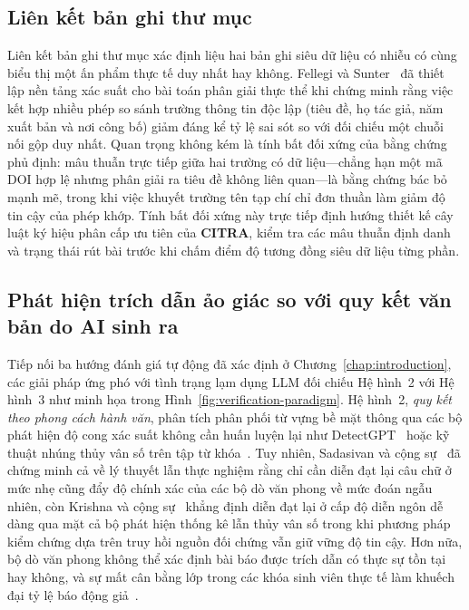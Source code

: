 \subsection{Liên kết bản ghi thư mục}

Liên kết bản ghi thư mục xác định liệu hai bản ghi siêu dữ liệu có nhiễu có cùng biểu thị một ấn phẩm thực tế duy nhất hay không. Fellegi và Sunter~\cite{Fellegi1969} đã thiết lập nền tảng xác suất cho bài toán phân giải thực thể khi chứng minh rằng việc kết hợp nhiều phép so sánh trường thông tin độc lập (tiêu đề, họ tác giả, năm xuất bản và nơi công bố) giảm đáng kể tỷ lệ sai sót so với đối chiếu một chuỗi nối gộp duy nhất. Quan trọng không kém là tính bất đối xứng của bằng chứng phủ định: mâu thuẫn trực tiếp giữa hai trường có dữ liệu---chẳng hạn một mã DOI hợp lệ nhưng phân giải ra tiêu đề không liên quan---là bằng chứng bác bỏ mạnh mẽ, trong khi việc khuyết trường tên tạp chí chỉ đơn thuần làm giảm độ tin cậy của phép khớp. Tính bất đối xứng này trực tiếp định hướng thiết kế cây luật ký hiệu phân cấp ưu tiên của \textbf{CITRA}, kiểm tra các mâu thuẫn định danh và trạng thái rút bài trước khi chấm điểm độ tương đồng siêu dữ liệu từng phần.

\subsection{Phát hiện trích dẫn ảo giác so với quy kết văn bản do AI sinh ra}

Tiếp nối ba hướng đánh giá tự động đã xác định ở Chương~\ref{chap:introduction}, các giải pháp ứng phó với tình trạng lạm dụng LLM đối chiếu Hệ hình~2 với Hệ hình~3 như minh họa trong Hình~\ref{fig:verification-paradigm}. Hệ hình~2, \emph{quy kết theo phong cách hành văn}, phân tích phân phối từ vựng bề mặt thông qua các bộ phát hiện độ cong xác suất không cần huấn luyện lại như DetectGPT~\cite{mitchell2023detectgpt} hoặc kỹ thuật nhúng thủy vân số trên tập từ khóa~\cite{kirchenbauer2023watermark}. Tuy nhiên, Sadasivan và cộng sự~\cite{Sadasivan2023} đã chứng minh cả về lý thuyết lẫn thực nghiệm rằng chỉ cần diễn đạt lại câu chữ ở mức nhẹ cũng đẩy độ chính xác của các bộ dò văn phong về mức đoán ngẫu nhiên, còn Krishna và cộng sự~\cite{krishna2023paraphrasing} khẳng định diễn đạt lại ở cấp độ diễn ngôn dễ dàng qua mặt cả bộ phát hiện thống kê lẫn thủy vân số trong khi phương pháp kiểm chứng dựa trên truy hồi nguồn đối chứng vẫn giữ vững độ tin cậy. Hơn nữa, bộ dò văn phong không thể xác định bài báo được trích dẫn có thực sự tồn tại hay không, và sự mất cân bằng lớp trong các khóa sinh viên thực tế làm khuếch đại tỷ lệ báo động giả~\cite{Chawla2009}.

